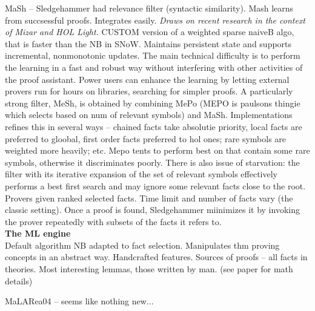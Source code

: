 \documentclass{article}
\begin{document}
MaSh \cite{MaSh} -- Sledgehammer had relevance filter (syntactic similarity).
Mash learns from succsessful proofs. Integrates easily. \emph{Draws on recent
research in the context of Mizar and HOL Light.} CUSTOM version of a weighted
sparse naiveB algo, that is faster than the NB in SNoW. Maintains persistent
state and supports incremental, nonmonotonic updates.  The main technical
difficulty is to perform the learning in a fast and robust way without
interfering with other activities of the proof assistant. Power users can
enhance the learning by letting external provers run for hours on libraries,
searching for simpler proofs. A particularly strong filter, MeSh, is obtained
by combining MePo (MEPO is paulsons thingie which selects based on num of
relevant symbols) and MaSh. Implementations refines this in several ways --
chained facts take absolutie priority, local facts are preferred to gloobal,
first order facts preferred to hol ones; rare symbols are weighted more
heavily; etc. Mepo tents to perform best on that contain some rare symbols,
otherwise it discriminates poorly. There is also issue of starvation: the
filter with its iterative expansion of the set of relevant symbols effectively
performs a best first search and may ignore some relevant facts close to the
root. Provers given ranked selected facts. Time limit and number of facts vary
(the classic setting). Once a proof is found, Sledgehammer miinimizes it by
invoking the prover repeatedly with subsets of the facts it refers to. 
\\\textbf{The ML engine}\\
Default algorithm NB adapted to fact selection. Manipulates thm proving
concepts in an abstract way. Handcrafted features. Sources of proofs -- all
facts in theories. Most interesting lemmas, those written by man. (see paper
for math details)

MaLARea04 \cite{MaLARea04} -- seems like nothing new...
\end{document}
